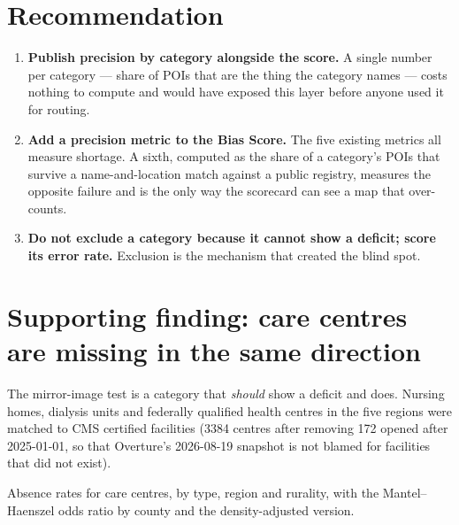\documentclass[a4paper]{article}
\begin{document}
\section{Recommendation}

\begin{enumerate}
\item \textbf{Publish precision by category alongside the score.} A single number per
category --- share of POIs that are the thing the category names --- costs nothing to compute
and would have exposed this layer before anyone used it for routing.
\item \textbf{Add a precision metric to the Bias Score.} The five existing metrics all measure
shortage. A sixth, computed as the share of a category's POIs that survive a name-and-location
match against a public registry, measures the opposite failure and is the only way the
scorecard can see a map that over-counts.
\item \textbf{Do not exclude a category because it cannot show a deficit; score its error
rate.} Exclusion is the mechanism that created the blind spot.
\end{enumerate}

\section{Supporting finding: care centres are missing in the same direction}

The mirror-image test is a category that \emph{should} show a deficit and does. Nursing homes,
dialysis units and federally qualified health centres in the five regions were matched to CMS
certified facilities (\num{3384} centres after removing \num{172} opened after 2025-01-01, so
that Overture's 2026-08-19 snapshot is not blamed for facilities that did not exist).

\begin{table}[htbp]
\centering
\caption{Absence rates for care centres, by type, region and rurality, with the
Mantel--Haenszel odds ratio by county and the density-adjusted version.}
\label{tab:care_rates}
\begin{adjustbox}{max width=\textwidth}

\end{adjustbox}
\end{table}
\end{document}

